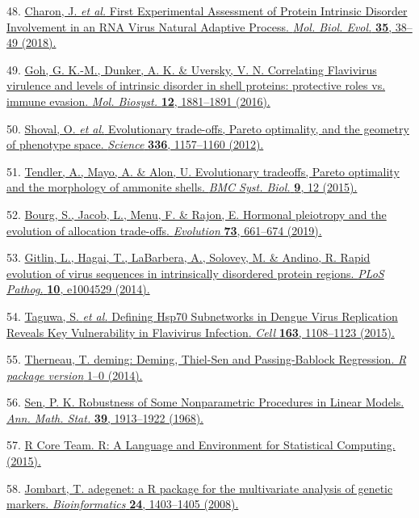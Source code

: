 \documentclass[
]{article}
\begin{document}
48. \href{http://paperpile.com/b/REZjPf/mhPR}{Charon, J. \emph{et al.}
First Experimental Assessment of Protein Intrinsic Disorder Involvement
in an RNA Virus Natural Adaptive Process. \emph{Mol. Biol. Evol.}
\textbf{35}, 38--49 (2018).}

49. \href{http://paperpile.com/b/REZjPf/KHg7}{Goh, G. K.-M., Dunker, A.
K. \& Uversky, V. N. Correlating Flavivirus virulence and levels of
intrinsic disorder in shell proteins: protective roles vs. immune
evasion. \emph{Mol. Biosyst.} \textbf{12}, 1881--1891 (2016).}

50. \href{http://paperpile.com/b/REZjPf/KuSMk}{Shoval, O. \emph{et al.}
Evolutionary trade-offs, Pareto optimality, and the geometry of
phenotype space. \emph{Science} \textbf{336}, 1157--1160 (2012).}

51. \href{http://paperpile.com/b/REZjPf/gqelx}{Tendler, A., Mayo, A. \&
Alon, U. Evolutionary tradeoffs, Pareto optimality and the morphology of
ammonite shells. \emph{BMC Syst. Biol.} \textbf{9}, 12 (2015).}

52. \href{http://paperpile.com/b/REZjPf/QZFTJ}{Bourg, S., Jacob, L.,
Menu, F. \& Rajon, E. Hormonal pleiotropy and the evolution of
allocation trade-offs. \emph{Evolution} \textbf{73}, 661--674 (2019).}

53. \href{http://paperpile.com/b/REZjPf/pUdK}{Gitlin, L., Hagai, T.,
LaBarbera, A., Solovey, M. \& Andino, R. Rapid evolution of virus
sequences in intrinsically disordered protein regions. \emph{PLoS
Pathog.} \textbf{10}, e1004529 (2014).}

54. \href{http://paperpile.com/b/REZjPf/py7tY}{Taguwa, S. \emph{et al.}
Defining Hsp70 Subnetworks in Dengue Virus Replication Reveals Key
Vulnerability in Flavivirus Infection. \emph{Cell} \textbf{163},
1108--1123 (2015).}

55. \href{http://paperpile.com/b/REZjPf/TJLiW}{Therneau, T. deming:
Deming, Thiel-Sen and Passing-Bablock Regression. \emph{R package
version} 1--0 (2014).}

56. \href{http://paperpile.com/b/REZjPf/xDHhy}{Sen, P. K. Robustness of
Some Nonparametric Procedures in Linear Models. \emph{Ann. Math. Stat.}
\textbf{39}, 1913--1922 (1968).}

57. \href{http://paperpile.com/b/REZjPf/uGyfe}{R Core Team. R: A
Language and Environment for Statistical Computing. (2015).}

58. \href{http://paperpile.com/b/REZjPf/V25w7}{Jombart, T. adegenet: a R
package for the multivariate analysis of genetic markers.
\emph{Bioinformatics} \textbf{24}, 1403--1405 (2008).}
\end{document}
